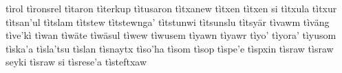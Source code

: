 \documentclass[a4paper]{article}
\begin{document}
tìrol\hspace{2mm}
tìronsrel\hspace{2mm}
tìtaron\hspace{2mm}
tìterkup\hspace{2mm}
tìtusaron\hspace{2mm}
tìtxanew\hspace{2mm}
tìtxen\hspace{2mm}
tìtxen si\hspace{2mm}
tìtxula\hspace{2mm}
tìtxur\hspace{2mm}
tìtsan'ul\hspace{2mm}
tìtslam\hspace{2mm}
tìtstew\hspace{2mm}
tìtstewnga'\hspace{2mm}
tìtstunwi\hspace{2mm}
tìtsunslu\hspace{2mm}
tìtsyär\hspace{2mm}
tìvawm\hspace{2mm}
tìväng\hspace{2mm}
tìve'kì\hspace{2mm}
tìwan\hspace{2mm}
tìwäte\hspace{2mm}
tìwäsul\hspace{2mm}
tìwew\hspace{2mm}
tìwusem\hspace{2mm}
tìyawn\hspace{2mm}
tìyawr\hspace{2mm}
tìyo'\hspace{2mm}
tìyora'\hspace{2mm}
tìyusom\hspace{2mm}
tìska'a\hspace{2mm}
tìsla'tsu\hspace{2mm}
tìslan\hspace{2mm}
tìsnaytx\hspace{2mm}
tìso'ha\hspace{2mm}
tìsom\hspace{2mm}
tìsop\hspace{2mm}
tìspe'e\hspace{2mm}
tìspxin\hspace{2mm}
tìsraw\hspace{2mm}
tìsraw seyki\hspace{2mm}
tìsraw si\hspace{2mm}
tìsrese'a\hspace{2mm}
tìsteftxaw\hspace{2mm}
\end{document}

